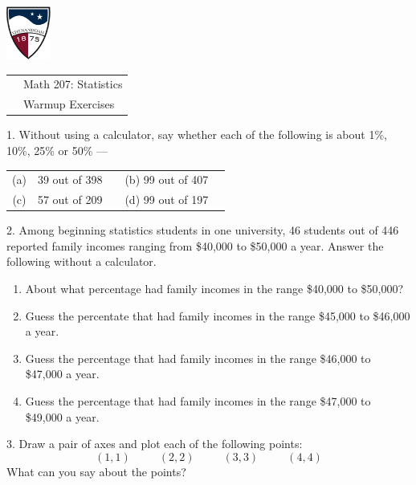 \documentclass[10pt]{article}
\begin{document}
\pagestyle{empty}

\href{http://www.su.edu}{\includegraphics[height=1.75cm]{sulogo.eps}}
\vspace{-1.69cm}

{\small
\begin{tabular}{cl}
\hspace{5in} & Math 207:  Statistics\\
                & Warmup Exercises\\
\end{tabular}
}

\setlength{\baselineskip}{1.05\baselineskip}
\bigskip

1.  Without using a calculator, 
say whether each of the following is about 1\%, 10\%, 25\% or 50\% ---
\begin{center}
\begin{tabular}{clccl}
(a) & 39 out of 398 & \hspace{2in}  & (b) 99 out of 407\\[10pt]
(c) & 57 out of 209 &               & (d) 99 out of 197
\end{tabular}
\end{center}

2. Among beginning statistics students in one university, 46 students
out of 446 reported family incomes ranging from \$40,000 to \$50,000 a year.
Answer the following without a calculator.
\begin{enumerate}
\item[(a)] About what percentage had family incomes in the range \$40,000 
  to \$50,000?
\item[(b)] Guess the percentate that had family incomes in the range \$45,000 to \$46,000
   a year.
\item[(c)] Guess the percentage that had family incomes in the range \$46,000 to
   \$47,000 a year.
\item[(d)] Guess the percentage that had family incomes in the range \$47,000 to
   \$49,000 a year.
\end{enumerate}

\newcommand{\HS}{\hspace{30pt}}
3. Draw a pair of axes and plot each of the following points:
\[(1,1)\HS (2,2)\HS (3,3)\HS (4,4)\]
What can you say about the points?
\end{document}
